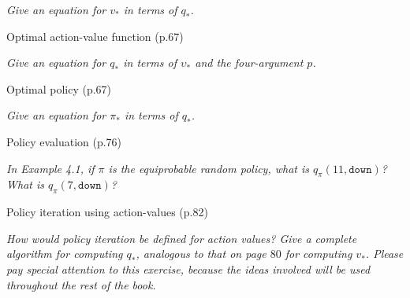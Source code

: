 \documentclass[12pt,letterpaper]{exam}
\newcommand{\chapter}{2}
\begin{document}
\begin{questions}
	\emph{Give an equation for \(v_*\) in terms of \(q_*\).}
	\begin{solution}

	\end{solution}

	\question%
	Optimal action-value function (p.67)

	\emph{Give an equation for \(q_*\) in terms of \(\upsilon_*\) and the four-argument \(p\).}
	\begin{solution}

	\end{solution}

	\question%
	Optimal policy (p.67)

	\emph{Give an equation for \(\pi_*\) in terms of \(q_*\).}
	\begin{solution}

	\end{solution}

	\setcounter{section}{4}
	\renewcommand\chapter{4}
	\setcounter{question}{1-1}%
	\question%
	Policy evaluation (p.76)

	\emph{In Example 4.1, if \(\pi\) is the equiprobable random policy, what is \(q_\pi(11, \texttt{down})\)? 
	What is \(q_\pi(7, \texttt{down})\)?}
	\begin{solution}

	\end{solution}

	\setcounter{question}{5-1}%
	\question%
	Policy iteration using action-values (p.82)
	
	\emph{How would policy iteration be defined for action values? Give a complete algorithm for computing 
	\(q_*\), analogous to that on page \(80\) for computing \(v_*\). 
	Please pay special attention to this exercise, because the ideas involved will be used throughout the rest of the book.}
	\begin{solution}

	\end{solution}


\end{questions}
\end{document}
